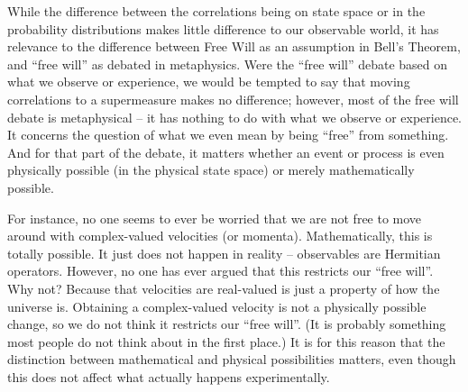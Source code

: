 \documentclass{article}
\begin{document}

While the difference between the correlations being on state space or in the probability distributions makes little difference to our observable world, it has relevance to the difference between Free Will as an assumption in Bell's Theorem, and ``free will'' as debated in metaphysics. Were the ``free will'' debate based on what we observe or experience, we would be tempted to say that moving correlations to a supermeasure makes no difference; however, most of the free will debate is metaphysical -- it has nothing to do with what we observe or experience. It concerns the question of what we even mean by being ``free'' from something. And for that part of the debate, it matters whether an event or process is even physically possible (in the physical state space) or merely mathematically possible. 

For instance, no one seems to ever be worried that we are not free to move around with complex-valued velocities (or momenta). Mathematically, this is totally possible. It just does not happen in reality -- observables are Hermitian operators. However, no one has ever argued that this restricts our ``free will''. Why not? Because that velocities are real-valued is just a property of how the universe is. Obtaining a complex-valued velocity is not a physically possible change, so we do not think it restricts our ``free will''. (It is probably something most people do not think about in the first place.) It is for this reason that the distinction between mathematical and physical possibilities matters, even though this does not affect what actually happens experimentally.
\end{document}
